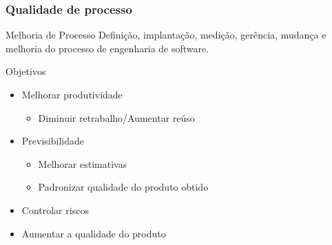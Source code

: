 \begin{frame}[parent={ie:agenda}, hasnext=true, hasprev=false]
	\frametitle{Qualidade de processo}
	
	\begin{block:concept}{Melhoria de Processo}
		Definição, implantação, medição, gerência, mudança e melhoria do
		processo de engenharia de software.
	\end{block:concept}
	
	\begin{block:fact}{Objetivos}
		\begin{itemize}
			\item Melhorar produtividade
			\begin{itemize}
				\item Diminuir retrabalho/Aumentar reúso
			\end{itemize}
			
			\item Previsibilidade
			\begin{itemize}
				\item Melhorar estimativas
				\item Padronizar qualidade do produto obtido
			\end{itemize}
			
			\item Controlar riscos
			
			\item Aumentar a qualidade do produto
		\end{itemize}
	\end{block:fact}
\end{frame}


